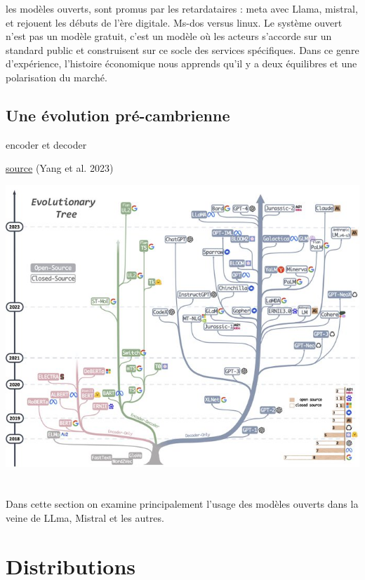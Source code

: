 \documentclass[
  letterpaper,
  DIV=11,
  numbers=noendperiod]{scrreprt}
\begin{document}
les modèles ouverts, sont promus par les retardataires : meta avec
Llama, mistral, et rejouent les débuts de l'ère digitale. Ms-dos versus
linux. Le système ouvert n'est pas un modèle gratuit, c'est un modèle où
les acteurs s'accorde sur un standard public et construisent sur ce
socle des services spécifiques. Dans ce genre d'expérience, l'histoire
économique nous apprends qu'il y a deux équilibres et une polarisation
du marché.

\subsection{Une évolution
pré-cambrienne}\label{une-uxe9volution-pruxe9-cambrienne}

encoder et decoder

\href{https://github.com/Mooler0410/LLMsPracticalGuide}{source} (Yang et
al. 2023)

\includegraphics{image/LLMevolution.jpg}

\section{}\label{section}

Dans cette section on examine principalement l'usage des modèles ouverts
dans la veine de LLma, Mistral et les autres.

\section{Distributions}\label{distributions}
\end{document}
